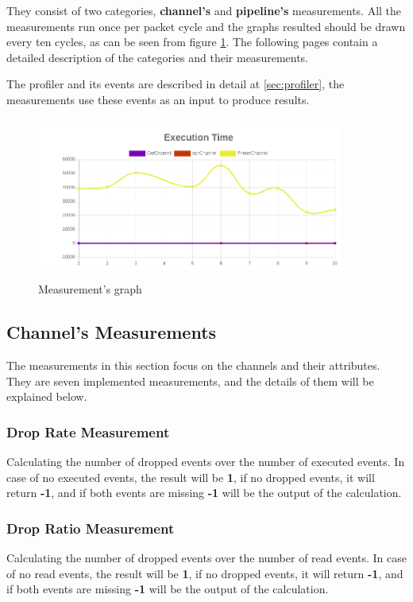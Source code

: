 They consist of two categories, \textbf{channel's} and \textbf{pipeline's} measurements. All the
measurements run once per packet cycle and the graphs resulted should be drawn every ten cycles,
as can be seen from figure \ref{fig:measurement_graph}. The following pages contain a detailed description
of the categories and their measurements.

The profiler and its events are described in detail at \ref{sec:profiler}, the measurements
use these events as an input to produce results.
\newline
\begin{figure}[H]
	\centering
	\includegraphics[width=0.9\textwidth,height=200px]{images/basic_graph.png}
	\caption{Measurement's graph}
	\label{fig:measurement_graph}
\end{figure}

\subsection{Channel's Measurements}
The measurements in this section focus on the channels and their attributes. They are seven implemented
measurements, and the details of them will be explained below.

\subsubsection{Drop Rate Measurement}
Calculating the number of dropped events over the number of executed events. In case of no executed events,
the result will be \textbf{1}, if no dropped events, it will return \textbf{-1}, and if both events are missing
\textbf{-1} will be the output of the calculation.

\subsubsection{Drop Ratio Measurement}
Calculating the number of dropped events over the number of read events. In case of no read events,
the result will be \textbf{1}, if no dropped events, it will return \textbf{-1}, and if both events are missing
\textbf{-1} will be the output of the calculation.
 
